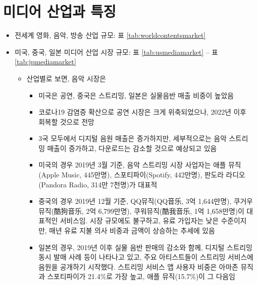\section{미디어 산업과 특징}\label{sec:}
\begin{itemize}
\item 전세계 영화, 음악, 방송 산업 규모: 표 \ref{tab:worldcontentsmarket}
\item 미국, 중국, 일본 미디어 산업 시장 규모: 표 \ref{tab:usmediamarket} -- 표 \ref{tab:jpmediamarket}
	\begin{itemize}
	\item 산업별로 보면, 음악 시장은
		\begin{itemize}
		\item 미국은 공연, 중국은 스트리밍, 일본은 실물음반 매출 비중이 높았음
		\item 코로나19 감염증 확산으로 공연 시장은 크게 위축되었으나, 2022년 이후 회복할 것으로 전망
		\item 3국 모두에서 디지털 음원 매출은 증가하지만, 세부적으로는 음악 스트리밍 매출이 증가하고, 다운로드는 감소할 것으로 예상되고 있음
		\item 미국의 경우 2019년 3월 기준, 음악 스트리밍 시장 사업자는 애플 뮤직(Apple Music, 445만명), 스포티파이(Spotify, 442만명), 판도라 라디오(Pandora Radio, 314만 7천명)가 대표적
		\item 중국의 경우 2019년 12월 기준, QQ뮤직(QQ音乐, 3억 1,644만명), 쿠거우 뮤직(酷狗音乐, 2억 6,799만명), 쿠워뮤직(酷我音乐, 1억 1,658만명)이 대표적인 서비스임. 시장 규모에도 불구하고, 유료 가입자는 낮은 수준이지만, 매년 유료 지불 의사 비중과 금액이 상승하는 추세에 있음
		\item 일본의 경우, 2019년 이후 실물 음반 판매의 감소와 함께, 디지털 스트리밍 동시 발매 사례 등이 나타나고 있고, 주요 아티스트들이 스트리밍 서비스에 음원을 공개하기 시작했다. 스트리밍 서비스 앱 사용자 비중은 아마존 뮤직과 스포티파이가 21.4\%로 가장 높고, 애플 뮤직(15.7\%)이 그 다음임
		\end{itemize}


\end{itemize}
\end{itemize}
